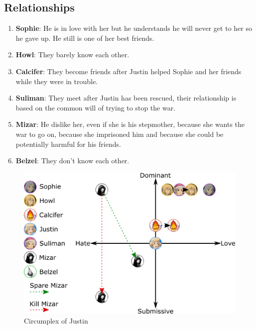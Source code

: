 \subsection{Relationships}
\begin{enumerate}
\item \textbf{Sophie}: He is in love with her but he understands he will never get to her so he gave up. He still is one of her best friends.
\item \textbf{Howl}: They barely know each other.
\item \textbf{Calcifer}: They become friends after Justin helped Sophie and her friends while they were in trouble.
\item \textbf{Suliman}: They meet after Justin has been rescued, their relationship is based on the common will of trying to stop the war.
\item \textbf{Mizar}: He dislike her, even if she is his stepmother, because she wants the war to go on, because she imprisoned him and because she could be potentially harmful for his friends.
\item \textbf{Belzel}: They don't know each other.
\end{enumerate}

\begin{figure}[H]
  \centering
  \includegraphics[width=14cm]{Images/Diagrams/Circumplexes/justinCircumplex}
  \caption{Circumplex of Justin}
\end{figure}

